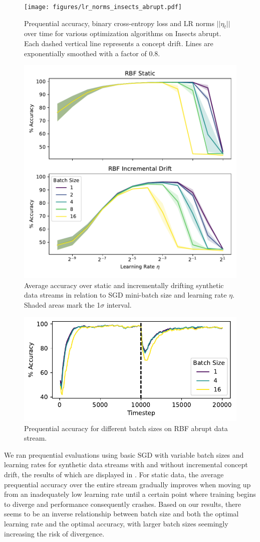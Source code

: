 \documentclass[letterpaper]{article} %
\begin{document}
\begin{figure}
	\centering
	\texttt{[image: figures/lr\_norms\_insects\_abrupt.pdf]}
	\caption{Prequential accuracy, binary cross-entropy loss and LR norms $||\eta_t||$ over time for various optimization algorithms on Insects abrupt. Each dashed vertical line represents a concept drift. Lines are exponentially smoothed with a factor of 0.8.}
\end{figure}
\begin{figure}
	\centering
	\includegraphics[width=.47\textwidth]{figures/batch_size_lr_wstd.pdf}
	\caption{Average accuracy over static and incrementally drifting synthetic data streams in relation to SGD mini-batch size and learning rate $\eta$. Shaded areas mark the 1$\sigma$ interval.}\label{fig:batch_size_lr}
\end{figure}

\begin{figure}
	\centering
	\includegraphics[width=.47\textwidth]{figures/accuracy_vs_time.pdf}
	\caption{Prequential accuracy for different batch sizes on RBF abrupt data stream.}
\end{figure}

We ran prequential evaluations using basic SGD with variable batch sizes and learning rates for synthetic data streams with and without incremental concept drift, the results of which are displayed in . For static data, the average prequential accuracy over the entire stream gradually improves when moving up from an inadequately low learning rate until a certain point where training begins to diverge and performance consequently crashes. Based on our results, there seems to be an inverse relationship between batch size and both the optimal learning rate and the optimal accuracy, with larger batch sizes seemingly increasing the risk of divergence.
\end{document}
